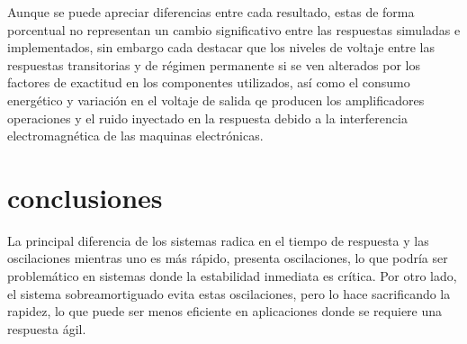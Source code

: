 \documentclass[conference]{IEEEtran}
\begin{document}
	 Aunque se puede apreciar diferencias entre cada resultado, estas de forma porcentual no representan un cambio significativo entre las respuestas simuladas e implementados, sin embargo cada destacar que los niveles de voltaje entre las respuestas transitorias y de régimen permanente si se ven alterados por los factores de exactitud en los componentes utilizados, así como el consumo energético y variación en el voltaje de salida qe producen los amplificadores operaciones y el ruido inyectado en la respuesta debido a la interferencia electromagnética de las maquinas electrónicas.
	 
	 \section{conclusiones}
	 La principal diferencia de los sistemas radica en el tiempo de respuesta y las oscilaciones mientras uno es más rápido, presenta oscilaciones, lo que podría ser problemático en sistemas donde la estabilidad inmediata es crítica. Por otro lado, el sistema sobreamortiguado evita estas oscilaciones, pero lo hace sacrificando la rapidez, lo que puede ser menos eficiente en aplicaciones donde se requiere una respuesta ágil.
	 
	
	
\end{document}
